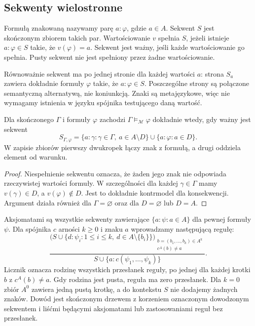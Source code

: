 \subsection{Sekwenty wielostronne}
\begin{definicja}\label{def:ncl-signed-sequent}
Formułą znakowaną nazywamy parę $a:\varphi$,
gdzie $a\in A$. Sekwent $S$ jest skończonym zbiorem
takich par. Wartościowanie $v$ spełnia $S$, jeżeli
istnieje $a:\varphi\in S$ takie, że $v(\varphi)=a$.
Sekwent jest ważny, jeśli każde wartościowanie
go spełnia. Pusty sekwent nie jest spełniony
przez żadne wartościowanie.
\end{definicja}
Równoważnie sekwent ma po jednej stronie dla każdej
wartości $a$: strona $S_a$ zawiera dokładnie formuły
$\varphi$ takie, że $a:\varphi\in S$.
Poszczególne strony są połączone semantyczną
alternatywą, nie koniunkcją. Znaki są metajęzykowe,
więc nie wymagamy istnienia w języku spójnika
testującego daną wartość.

\begin{stwierdzenie}
\label{prop:ncl-sequent-consequence}
Dla skończonego $\Gamma$ i formuły $\varphi$ zachodzi
$\Gamma\models_{\mathcal M}\varphi$ dokładnie wtedy,
gdy ważny jest sekwent
\[
 S_{\Gamma,\varphi}=
 \{a:\gamma:\gamma\in\Gamma,\ a\in A\setminus D\}
 \cup\{a:\varphi:a\in D\}.
\]
W zapisie zbiorów pierwszy dwukropek łączy znak
z formułą, a drugi oddziela element od warunku.
\end{stwierdzenie}
\begin{proof}
Niespełnienie sekwentu oznacza, że żaden jego
znak nie odpowiada rzeczywistej wartości formuły.
W szczególności dla każdej $\gamma\in\Gamma$
mamy $v(\gamma)\in D$, a $v(\varphi)\notin D$.
Jest to dokładnie kontrmodel dla konsekwencji.
Argument działa również dla $\Gamma=\varnothing$
oraz dla $D=\varnothing$ lub $D=A$.
\end{proof}

\begin{definicja}
\label{def:ncl-matrix-sequent-calculus}
Aksjomatami są wszystkie sekwenty zawierające
$\{a:\psi:a\in A\}$ dla pewnej formuły $\psi$.
Dla spójnika $c$ arności $k\geq0$ i znaku $a$
wprowadzamy następującą regułę:
\[
\frac{
 \bigl(S\cup
       \{d:\psi_i:1\leq i\leq k,\ d\in A\setminus\{b_i\}\}
 \bigr)_{\substack{b=(b_1,\ldots,b_k)\in A^k\\
                    c^A(b)\ne a}}
}{
 S\cup\{a:c(\psi_1,\ldots,\psi_k)\}
}.
\]
Licznik oznacza rodzinę wszystkich przesłanek reguły,
po jednej dla każdej krotki $b$ z $c^A(b)\ne a$.
Gdy rodzina jest pusta, reguła ma zero przesłanek.
Dla $k=0$ zbiór $A^0$ zawiera jedną pustą krotkę,
a do kontekstu $S$ nie dodajemy żadnych znaków.
Dowód jest skończonym drzewem z korzeniem
oznaczonym dowodzonym sekwentem i liśćmi będącymi
aksjomatami lub zastosowaniami reguł bez przesłanek.
\end{definicja}

